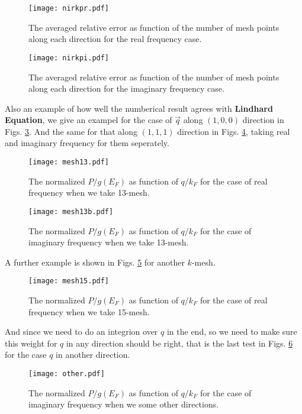 \begin{figure}[h]
\texttt{[image: nirkpr.pdf]}
\caption{The averaged relative error as function of the number of mesh points along each direction for the real frequency case.
} \label{nirkpr}
\end{figure}


\begin{figure}[h]
\texttt{[image: nirkpi.pdf]}
\caption{The averaged relative error as function of the number of mesh points along each direction for the imaginary frequency case.
} \label{nirkpi}
\end{figure}

Also an example of how well the numberical result agrees with \textbf{Lindhard Equation}, we give an exampel for the case of $\vec{q}$ along $(1,0,0)$ direction in Figs. \ref{mesh13}. And the same for that along $(1,1,1)$ direction in Figs. \ref{mesh13b}, taking real and imaginary frequency for them seperately.\\


\begin{figure}[h]
\texttt{[image: mesh13.pdf]}
\caption{The normalized $P/g(E_F)$ as function of $q/k_F$ for the case of real frequency when we take 13-mesh.
} \label{mesh13}
\end{figure}


\begin{figure}[h]
\texttt{[image: mesh13b.pdf]}
\caption{The normalized $P/g(E_F)$ as function of $q/k_F$ for the case of imaginary frequency when we take 13-mesh.
} \label{mesh13b}
\end{figure}

A further example is shown in Figs. \ref{mesh15} for another $k$-mesh.\\

\begin{figure}[h]
\texttt{[image: mesh15.pdf]}
\caption{The normalized $P/g(E_F)$ as function of $q/k_F$ for the case of real frequency when we take 15-mesh.
} \label{mesh15}
\end{figure}

And since we need to do an integrion over $q$ in the end, so we need to make sure this weight for $q$ in any direction should be right, that is the last test in Figs. \ref{other} for the case $q$ in another direction. 


\begin{figure}[h]
\texttt{[image: other.pdf]}
\caption{The normalized $P/g(E_F)$ as function of $q/k_F$ for the case of imaginary frequency when we some other directions.
} \label{other}
\end{figure}




